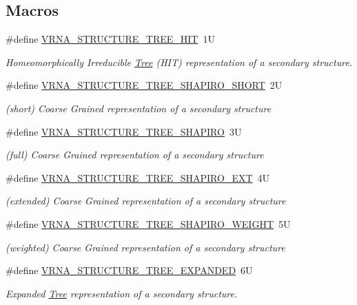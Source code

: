 \subsection*{Macros}
\begin{DoxyCompactItemize}
\item 
\#define \hyperlink{group__struct__utils__tree_ga3ad5609bc93ef20034c3ab989365c1f0}{V\+R\+N\+A\+\_\+\+S\+T\+R\+U\+C\+T\+U\+R\+E\+\_\+\+T\+R\+E\+E\+\_\+\+H\+IT}~1U
\begin{DoxyCompactList}\small\item\em Homeomorphically Irreducible \hyperlink{structTree}{Tree} (H\+IT) representation of a secondary structure. \end{DoxyCompactList}\item 
\#define \hyperlink{group__struct__utils__tree_ga549e259a963d77e2d5b7e14083fc016e}{V\+R\+N\+A\+\_\+\+S\+T\+R\+U\+C\+T\+U\+R\+E\+\_\+\+T\+R\+E\+E\+\_\+\+S\+H\+A\+P\+I\+R\+O\+\_\+\+S\+H\+O\+RT}~2U
\begin{DoxyCompactList}\small\item\em (short) Coarse Grained representation of a secondary structure \end{DoxyCompactList}\item 
\#define \hyperlink{group__struct__utils__tree_ga4acd9991a0250ccd4cd44c4725b31927}{V\+R\+N\+A\+\_\+\+S\+T\+R\+U\+C\+T\+U\+R\+E\+\_\+\+T\+R\+E\+E\+\_\+\+S\+H\+A\+P\+I\+RO}~3U
\begin{DoxyCompactList}\small\item\em (full) Coarse Grained representation of a secondary structure \end{DoxyCompactList}\item 
\#define \hyperlink{group__struct__utils__tree_ga8666a10982a4f7a26892066ff07b4b48}{V\+R\+N\+A\+\_\+\+S\+T\+R\+U\+C\+T\+U\+R\+E\+\_\+\+T\+R\+E\+E\+\_\+\+S\+H\+A\+P\+I\+R\+O\+\_\+\+E\+XT}~4U
\begin{DoxyCompactList}\small\item\em (extended) Coarse Grained representation of a secondary structure \end{DoxyCompactList}\item 
\#define \hyperlink{group__struct__utils__tree_ga91f2e3a3a502d5445fd7fe5983a5fe92}{V\+R\+N\+A\+\_\+\+S\+T\+R\+U\+C\+T\+U\+R\+E\+\_\+\+T\+R\+E\+E\+\_\+\+S\+H\+A\+P\+I\+R\+O\+\_\+\+W\+E\+I\+G\+HT}~5U
\begin{DoxyCompactList}\small\item\em (weighted) Coarse Grained representation of a secondary structure \end{DoxyCompactList}\item 
\#define \hyperlink{group__struct__utils__tree_gab3b65489d1322da65d3a3e53242307ef}{V\+R\+N\+A\+\_\+\+S\+T\+R\+U\+C\+T\+U\+R\+E\+\_\+\+T\+R\+E\+E\+\_\+\+E\+X\+P\+A\+N\+D\+ED}~6U
\begin{DoxyCompactList}\small\item\em Expanded \hyperlink{structTree}{Tree} representation of a secondary structure. \end{DoxyCompactList}\end{DoxyCompactItemize}
